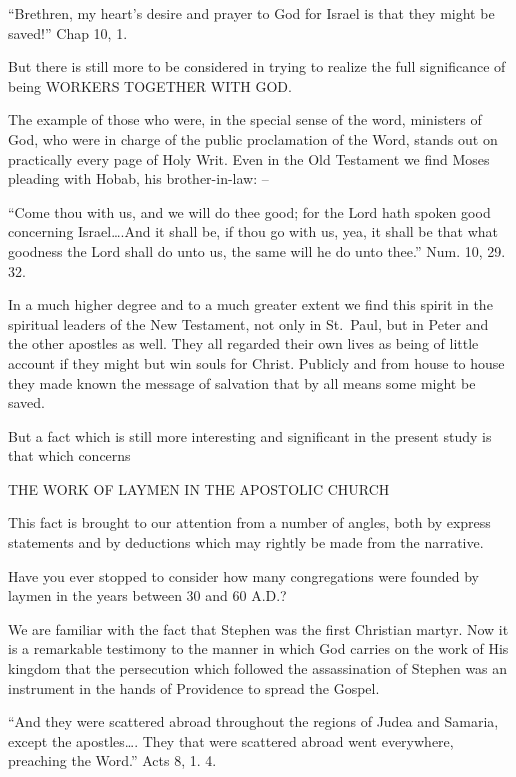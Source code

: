 \documentclass[
]{book}
\begin{document}
``Brethren, my heart's desire and prayer to God for Israel is that they might be saved!'' Chap 10, 1.

But there is still more to be considered in trying to realize the full significance of being WORKERS TOGETHER WITH GOD.

The example of those who were, in the special sense of the word, ministers of God, who were in charge of the public proclamation of the Word, stands out on practically every page of Holy Writ. Even in the Old Testament we find Moses pleading with Hobab, his brother-in-law: --

``Come thou with us, and we will do thee good; for the Lord hath spoken good concerning Israel\ldots.And it shall be, if thou go with us, yea, it shall be that what goodness the Lord shall do unto us, the same will he do unto thee.'' Num. 10, 29. 32.

In a much higher degree and to a much greater extent we find this spirit in the spiritual leaders of the New Testament, not only in St.~Paul, but in Peter and the other apostles as well. They all regarded their own lives as being of little account if they might but win souls for Christ. Publicly and from house to house they made known the message of salvation that by all means some might be saved.

But a fact which is still more interesting and significant in the present study is that which concerns

\begin{center} THE WORK OF LAYMEN IN THE APOSTOLIC CHURCH \end{center}

This fact is brought to our attention from a number of angles, both by express statements and by deductions which may rightly be made from the narrative.

Have you ever stopped to consider how many congregations were founded by laymen in the years between 30 and 60 A.D.?

We are familiar with the fact that Stephen was the first Christian martyr. Now it is a remarkable testimony to the manner in which God carries on the work of His kingdom that the persecution which followed the assassination of Stephen was an instrument in the hands of Providence to spread the Gospel.

``And they were scattered abroad throughout the regions of Judea and Samaria, except the apostles\ldots. They that were scattered abroad went everywhere, preaching the Word.'' Acts 8, 1. 4.
\end{document}

